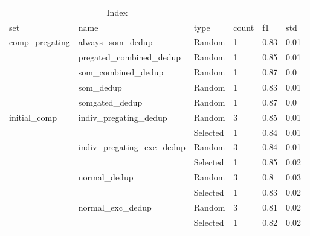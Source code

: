 \begin{tabular}{llllll}
\toprule
\multicolumn{3}{c}{Index} \\
\cmidrule(r){1-3}
set & name & type & count & f1 & std \\
\midrule
comp\_pregating & always\_som\_dedup & Random & 1 & 0.83 & 0.01 \\
  & pregated\_combined\_dedup & Random & 1 & 0.85 & 0.01 \\
  & som\_combined\_dedup & Random & 1 & 0.87 & 0.0 \\
  & som\_dedup & Random & 1 & 0.83 & 0.01 \\
  & somgated\_dedup & Random & 1 & 0.87 & 0.0 \\
initial\_comp & indiv\_pregating\_dedup & Random & 3 & 0.85 & 0.01 \\
  &   & Selected & 1 & 0.84 & 0.01 \\
  & indiv\_pregating\_exc\_dedup & Random & 3 & 0.84 & 0.01 \\
  &   & Selected & 1 & 0.85 & 0.02 \\
  & normal\_dedup & Random & 3 & 0.8 & 0.03 \\
  &   & Selected & 1 & 0.83 & 0.02 \\
  & normal\_exc\_dedup & Random & 3 & 0.81 & 0.02 \\
  &   & Selected & 1 & 0.82 & 0.02 \\
\bottomrule
\end{tabular}